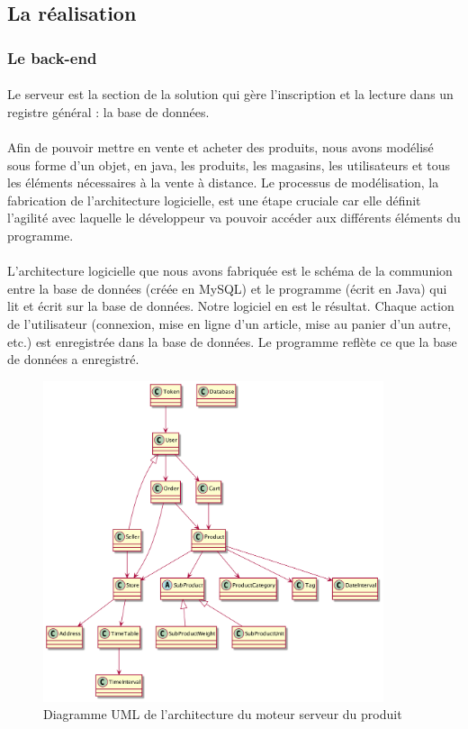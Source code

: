 \documentclass[a4paper, 12pt]{article}
\begin{document}
\subsection{La réalisation}
\subsubsection{Le back-end}

\paragraph{}Le serveur est la section de la solution qui gère l’inscription et la lecture dans un registre général : la base de données.
\paragraph{}Afin de pouvoir mettre en vente et acheter des produits, nous avons modélisé sous forme d’un objet, en java, les produits, les magasins, les utilisateurs et tous les éléments nécessaires à la vente à distance. Le processus de modélisation, la fabrication de l'architecture logicielle, est une étape cruciale car elle définit l’agilité avec laquelle le développeur va pouvoir accéder aux différents éléments du programme.
\paragraph{}L’architecture logicielle que nous avons fabriquée est le schéma de la communion entre la base de données (créée en MySQL) et le programme (écrit en Java) qui lit et écrit sur la base de données. Notre logiciel en est le résultat. Chaque action de l’utilisateur (connexion, mise en ligne d’un article, mise au panier d’un autre, etc.) est enregistrée dans la base de données. Le programme reflète ce que la base de données a enregistré.

\begin{figure}[H]
	\begin{center}
		\includegraphics[width=10cm]{fig/uml-simplified.png}
		\caption{Diagramme UML de l'architecture du moteur serveur du produit}
		\label{fig:uml-simplified}
	\end{center}
\end{figure}
\end{document}
